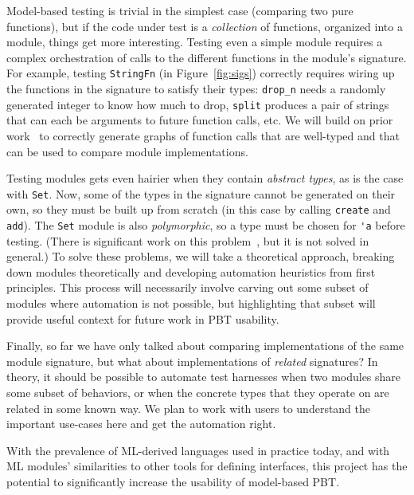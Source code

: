Model-based testing is trivial in the simplest case (comparing two pure
functions), but if the code under test is a {\em collection} of functions,
organized into a module, things get more interesting. Testing even a simple
module requires a complex orchestration of calls to the different functions in
the module's signature. For example, testing \lstinline{StringFn} (in
Figure~\ref{fig:sigs}) correctly requires wiring up the functions in the
signature to satisfy their types: \lstinline{drop_n} needs a randomly generated
integer to know how much to drop, \lstinline{split} produces a pair of strings
that can each be arguments to future function calls, etc. We will build on prior
work~\cite{hughes_experiences_2016} to correctly generate graphs of function
calls that are well-typed and that can be used to compare module implementations.

Testing modules gets even hairier when they contain {\em abstract types}, as is
the case with \lstinline{Set}. Now, some of the types in the signature cannot be
generated on their own, so they must be built up from scratch (in this case by
calling \lstinline{create} and \lstinline{add}). The \lstinline{Set} module is
also {\em polymorphic}, so a type must be chosen for \lstinline{'a} before
testing. (There is significant work on this
problem~\cite{hou_favonia_logarithm_2022}, but it is not solved in general.)
To solve these problems, we will take a theoretical approach, breaking down
modules theoretically and developing automation heuristics from first
principles. This process will necessarily involve carving out some subset of
modules where automation is not possible, but highlighting that subset will
provide useful context for future work in PBT usability.

Finally, so far we have only talked about comparing implementations of the same
module signature, but what about implementations of {\em related} signatures? In
theory, it should be possible to automate test harnesses when two modules share
some subset of behaviors, or when the concrete types that they operate on are
related in some known way. We plan to work with users to understand the
important use-cases here and get the automation right.

With the prevalence of ML-derived languages used in practice today, and with ML
modules' similarities to other tools for defining interfaces, this project has
the potential to significantly increase the usability of model-based PBT.

